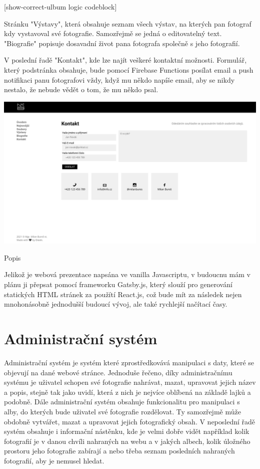 \documentclass[12pt,a4paper]{report}
\begin{document}
  [show-correct-ulbum logic codeblock]
 
  Stránku "Výstavy", která obsahuje seznam všech výstav, na kterých pan fotograf kdy vystavoval
  své fotografie. Samozřejmě se jedná o editovatelný text.
  "Biografie" popisuje dosavadní život pana fotografa společně s jeho fotografií.
  
  V poslední řadě "Kontakt", kde lze najít veškeré kontaktní možnosti. Formulář, který podstránka
  obsahuje, bude pomocí Firebase Functions posílat email a push notifikaci panu fotografovi vždy,
  když mu někdo napíše email, aby se nikdy nestalo, že nebude vědět o tom, že mu někdo psal.
 
  \vspace*{0.5cm}
  \noindent\includegraphics[width=\linewidth]{contact.png}
  \begin{center}
    Popis
  \end{center}
  \vspace*{0.5cm}

  Jelikož je webová prezentace napsána ve vanilla Javascriptu, v budoucnu mám v plánu ji přepsat
  pomocí frameworku Gatsby.js, který slouží pro generování statických HTML stránek za použítí
  React.js, což bude mít za následek nejen mnohonásobně jednodušší budoucí vývoj, ale také
  rychlejší načítací časy.

  \chapter{Administrační systém}
 
  Administrační systém je systém které zprostředkovává manipulaci s daty, které se objevují na
  dané webové stránce. Jednoduše řečeno, díky administračnímu systému je uživatel schopen své
  fotografie nahrávat, mazat, upravovat jejich název a popis, stejně tak jako uvidí, která z nich je
  nejvíce oblíbená na základě lajků a podobně. Dále administrační systém obsahuje funkcionalitu
  pro manipulaci s alby, do kterých bude uživatel své fotografie rozdělovat. Ty samozřejmě může
  obdobně vytvářet, mazat a upravovat jejich fotografický obsah. V neposlední řadě systém
  obsahuje i informační nástěnku, kde je velmi dobře vidět například kolik fotografií je v danou chvíli
  nahraných na webu a v jakých albech, kolik úložného prostoru jeho fotografie zabírají a nebo
  třeba seznam posledních nahraných fotografií, aby je nemusel hledat.
\end{document}
